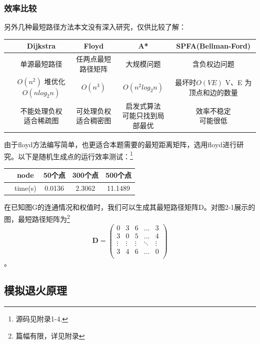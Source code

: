 \documentclass[12pt]{article}
\begin{document}
\subsubsection{效率比较}
另外几种最短路径方法本文没有深入研究，仅供比较了解：
\begin{table}\centering

\begin{tabular}{ccccc}
  \toprule
\cmidrule{1-4}
& Dijkstra & Floyd & A* & SPFA(Bellman-Ford)\\
  \midrule
& 单源最短路径 & 任两点最短路径矩阵 & 大规模问题 & 含负权边问题\\
 & \makecell[c]{$O(n^{2})$\\ 堆优化$O(nlog_{2}n)$}  & $O(n^{3})$ & $O(n^{2}log_{2}n)$ &  \makecell[c]{最坏时$O(VE)$ \\V、E 为顶点和边的数量} \\
&\makecell[c]{不能处理负权 \\ 适合稀疏图} & \makecell[c]{可处理负权\\ 适合稠密图} & \makecell[c]{启发式算法\\可能只找到局部最优} &\makecell[c]{效率不稳定\\可能很低} \\
  \bottomrule
\end{tabular}
\end{table}

由于floyd方法编写简单，也更适合本题需要的最短距离矩阵，选用floyd进行研究。以下是随机生成点的运行效率测试：\footnote{源码见附录1-4.}

\begin{tabular}{ccccc}
 \toprule
\cmidrule{1-4}
& node & 50个点 & 300个点 & 500个点\\
  \midrule
& time(s) & 0.0136 & 2.3062 & 11.1489\\
    \bottomrule
\end{tabular}

在已知图G的连通情况和权值时，我们可以生成其最短路径矩阵D。对图2-1展示的图，最短路径矩阵为\footnote{篇幅有限，详见附录}
\[ \mathbf{D} = \left( \begin{array}{ccccc}
0 & 3 & 6 &\ldots & 3\\ 3 & 0 & 5 &\ldots &4\\ 
\vdots & \vdots & \vdots  & \ddots  & \vdots
\\3 & 4 & 6 & \ldots & 0\\ \end{array} \right) \]。
\subsection{模拟退火原理}
\end{document}
